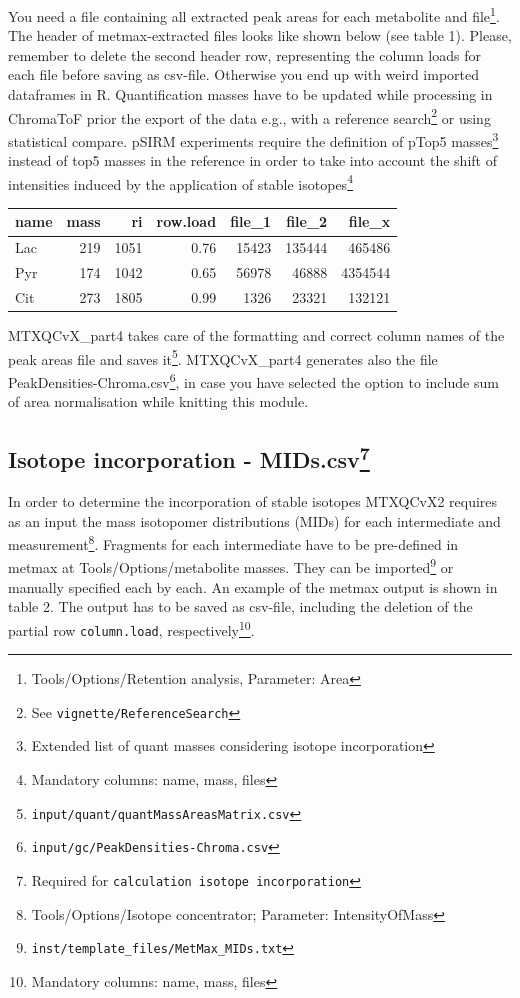 \documentclass[]{book}
\let\rmarkdownfootnote\footnote%
\def\footnote{\protect\rmarkdownfootnote}
\begin{document}
You need a file containing all extracted peak areas for each metabolite
and file\footnote{Tools/Options/Retention analysis, Parameter: Area}.
The header of metmax-extracted files looks like shown below (see table
1). Please, remember to delete the second header row, representing the
column loads for each file before saving as csv-file. Otherwise you end
up with weird imported dataframes in R. Quantification masses have to be
updated while processing in ChromaToF prior the export of the data e.g.,
with a reference search\footnote{See \texttt{vignette/ReferenceSearch}}
or using statistical compare. pSIRM experiments require the definition
of pTop5 masses\footnote{Extended list of quant masses considering
  isotope incorporation} instead of top5 masses in the reference in
order to take into account the shift of intensities induced by the
application of stable isotopes\footnote{Mandatory columns: name, mass,
  files}

\begin{tabular}{l|r|r|r|r|r|r}
\hline
name & mass & ri & row.load & file\_1 & file\_2 & file\_x\\
\hline
Lac & 219 & 1051 & 0.76 & 15423 & 135444 & 465486\\
\hline
Pyr & 174 & 1042 & 0.65 & 56978 & 46888 & 4354544\\
\hline
Cit & 273 & 1805 & 0.99 & 1326 & 23321 & 132121\\
\hline
\end{tabular}

MTXQCvX\_part4 takes care of the formatting and correct column names of
the peak areas file and saves it\footnote{\texttt{input/quant/quantMassAreasMatrix.csv}}.
MTXQCvX\_part4 generates also the file
PeakDensities-Chroma.csv\footnote{\texttt{input/gc/PeakDensities-Chroma.csv}},
in case you have selected the option to include sum of area
normalisation while knitting this module.

\subsection[Isotope incorporation - MIDs.csv]{\texorpdfstring{Isotope
incorporation - MIDs.csv\footnote{Required for
  \texttt{calculation\ isotope\ incorporation}}}{Isotope incorporation - MIDs.csv}}\label{isotope-incorporation---mids.csv}

In order to determine the incorporation of stable isotopes MTXQCvX2
requires as an input the mass isotopomer distributions (MIDs) for each
intermediate and measurement\footnote{Tools/Options/Isotope
  concentrator; Parameter: IntensityOfMass}. Fragments for each
intermediate have to be pre-defined in metmax at
Tools/Options/metabolite masses. They can be imported\footnote{\texttt{inst/template\_files/MetMax\_MIDs.txt}}
or manually specified each by each. An example of the metmax output is
shown in table 2. The output has to be saved as csv-file, including the
deletion of the partial row \texttt{column.load}, respectively\footnote{Mandatory
  columns: name, mass, files}.
\end{document}
